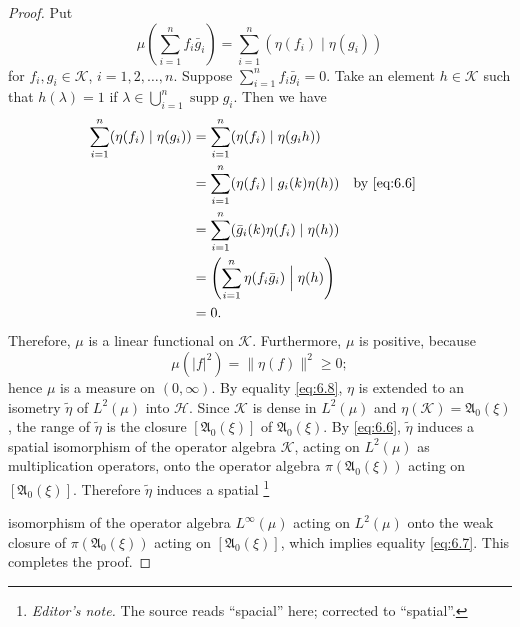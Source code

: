 \documentclass[12pt,b5paper,twoside]{article}
\theoremstyle{takesaki}
\numberwithin{equation}{section}
\newcounter{editorialnote}
\newcommand{\ednote}[1]{%
  \stepcounter{editorialnote}%
  \begingroup
  \renewcommand{\thefootnote}{E\arabic{editorialnote}}%
  \footnote{\textit{Editor's note.} #1}%
  \addtocounter{footnote}{-1}%
  \endgroup
}
\begin{document}
\begin{proof}
Put
\[
 \mu\!\left(\sum_{i=1}^n f_i\bar g_i\right)
 =\sum_{i=1}^n(\eta(f_i)\mid\eta(g_i))
\]
for $f_i,g_i\in\mathcal K$, $i=1,2,\ldots,n$.  Suppose
$\sum_{i=1}^n f_i\bar g_i=0$.  Take an element $h\in\mathcal K$ such
that $h(\lambda)=1$ if $\lambda\in\bigcup_{i=1}^n\operatorname{supp}g_i$.
Then we have
\begin{align*}
 \sum_{i=1}^n(\eta(f_i)\mid\eta(g_i))
  &=\sum_{i=1}^n(\eta(f_i)\mid\eta(g_i h))\\
  &=\sum_{i=1}^n(\eta(f_i)\mid g_i(k)\eta(h))
       &&\text{by \eqref{eq:6.6}}\\
  &=\sum_{i=1}^n(\bar g_i(k)\eta(f_i)\mid\eta(h))\\
  &=\left(\sum_{i=1}^n\eta(f_i\bar g_i)\mathrel{\Big|}\eta(h)\right)\\
  &=0.
\end{align*}
Therefore, $\mu$ is a linear functional on $\mathcal K$.  Furthermore,
$\mu$ is positive, because
\begin{equation}
 \mu(|f|^2)=\|\eta(f)\|^2\geq0;
 \tag{6.8}\label{eq:6.8}
\end{equation}
hence $\mu$ is a measure on $(0,\infty)$.  By equality
\eqref{eq:6.8}, $\eta$ is extended to an isometry $\widetilde\eta$ of
$L^2(\mu)$ into $\mathcal H$.  Since $\mathcal K$ is dense in
$L^2(\mu)$ and $\eta(\mathcal K)=\mathfrak A_0(\xi)$, the range of
$\widetilde\eta$ is the closure $[\mathfrak A_0(\xi)]$ of
$\mathfrak A_0(\xi)$.  By \eqref{eq:6.6}, $\widetilde\eta$ induces a
spatial isomorphism of the operator algebra $\mathcal K$, acting on
$L^2(\mu)$ as multiplication operators, onto the operator algebra
$\pi(\mathfrak A_0(\xi))$ acting on $[\mathfrak A_0(\xi)]$.
Therefore $\widetilde\eta$ induces a spatial\ednote{The source reads
``spacial'' here; corrected to ``spatial''.} isomorphism of the operator
algebra $L^\infty(\mu)$ acting on $L^2(\mu)$ onto the weak closure of
$\pi(\mathfrak A_0(\xi))$ acting on $[\mathfrak A_0(\xi)]$, which
implies equality \eqref{eq:6.7}.  This completes the proof.
\end{proof}
\end{document}
